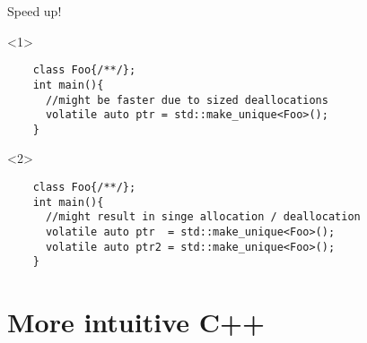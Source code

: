 \documentclass[10pt]{beamer}
\begin{document}
\begin{frame}[fragile]{Speed up!}

\begin{onlyenv}<1>
	\begin{verbatim}
	class Foo{/**/};
	int main(){
	  //might be faster due to sized deallocations
	  volatile auto ptr = std::make_unique<Foo>(); 
	}
	\end{verbatim}
\end{onlyenv}

\begin{onlyenv}<2>
\begin{verbatim}
	class Foo{/**/};
	int main(){
	  //might result in singe allocation / deallocation
	  volatile auto ptr  = std::make_unique<Foo>();
	  volatile auto ptr2 = std::make_unique<Foo>(); 
	}
	\end{verbatim}
\end{onlyenv}

\end{frame}

\section{More intuitive C++}
\end{document}
